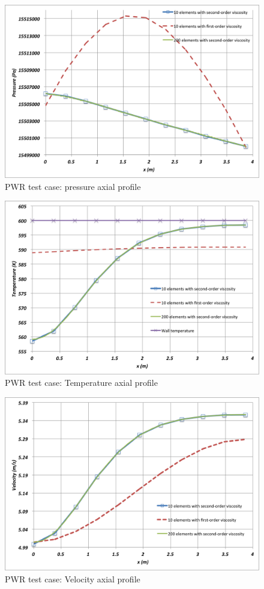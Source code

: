 \documentclass[12pt]{article}
\begin{document}
\begin{figure}[h]
\centering
\includegraphics[scale=0.4]{plots/Pressure.png}
\caption{PWR test case: pressure axial profile}
\label{fig:Pressure}
\end{figure}
\begin{figure}[h]
\centering
\includegraphics[scale=0.4]{plots/Temperature.png}
\caption{PWR test case: Temperature axial profile}
\label{fig:Temperature}
\end{figure}
\begin{figure}[h]
\centering
\includegraphics[scale=0.4]{plots/Velocity.png}
\caption{PWR test case: Velocity axial profile}
\label{fig:Velocity}
\end{figure}
\end{document}
